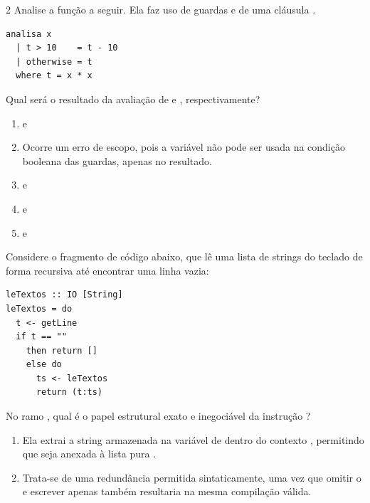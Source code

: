 \documentclass[a4paper,10pt,brazil]{article}
\begin{document}
\begin{multicols}{2}
Analise a função a seguir. Ela faz uso de guardas e de uma cláusula .

\begin{verbatim}
analisa x
  | t > 10    = t - 10
  | otherwise = t
  where t = x * x
\end{verbatim}

Qual será o resultado da avaliação de  e , respectivamente?

\begin{enumerate}
  \item {} e 

  \item Ocorre um erro de escopo, pois a variável  não pode ser usada na condição booleana das guardas, apenas no resultado.

  \item {} e 

  \item {} e 

  \item {} e 


\end{enumerate}

Considere o fragmento de código abaixo, que lê uma lista de strings do teclado de forma recursiva até encontrar uma linha vazia:

\begin{verbatim}
leTextos :: IO [String]
leTextos = do
  t <- getLine
  if t == "" 
    then return []
    else do
      ts <- leTextos
      return (t:ts)
\end{verbatim}

No ramo , qual é o papel estrutural exato e inegociável da instrução ?

\begin{enumerate}
  \item Ela extrai a string armazenada na variável  de dentro do contexto , permitindo que seja anexada à lista pura .

  \item Trata-se de uma redundância permitida sintaticamente, uma vez que omitir o  e escrever apenas  também resultaria na mesma compilação válida.


\end{enumerate}
\end{multicols}
\end{document}
